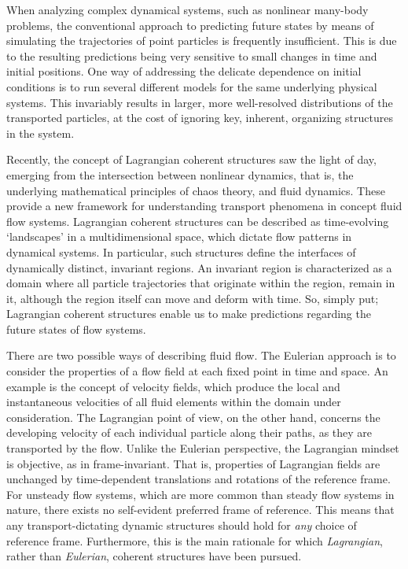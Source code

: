 When analyzing complex dynamical systems, such as nonlinear many-body problems,
the conventional approach to predicting future states by means of simulating
the trajectories of point particles is frequently insufficient. This is due
to the resulting predictions being very sensitive to small changes in time
and initial positions. One way of addressing the delicate dependence on initial
conditions is to run several different models for the same underlying physical
systems. This invariably results in larger, more well-resolved distributions
of the transported particles, at the cost of ignoring key, inherent, organizing
structures in the system.

Recently, the concept of Lagrangian coherent structures saw the light of day,
emerging from the intersection between nonlinear dynamics, that is, the
underlying mathematical principles of chaos theory, and fluid dynamics. These
provide a new framework for understanding transport phenomena in concept
fluid flow systems. Lagrangian coherent structures can be described as
time-evolving `landscapes' in a multidimensional space, which dictate flow
patterns in dynamical systems. In particular, such structures define the
interfaces of dynamically distinct, invariant regions. An invariant region is
characterized as a domain where all particle trajectories that originate within
the region, remain in it, although the region itself can move and deform with
time. So, simply put; Lagrangian coherent structures enable us to make
predictions regarding the future states of flow systems.

There are two possible ways of describing fluid flow. The Eulerian approach
is to consider the properties of a flow field at each fixed point in time and
space. An example is the concept of velocity fields, which produce the
local and instantaneous velocities of all fluid elements within the domain
under consideration. The Lagrangian point of view, on the other hand, concerns
the developing velocity of each individual particle along their paths, as they
are transported by the flow. Unlike the Eulerian perspective, the Lagrangian
mindset is objective, as in frame-invariant. That is, properties of Lagrangian
fields are unchanged by time-dependent translations and rotations of the
reference frame. For unsteady flow systems, which are more common than
steady flow systems in nature, there exists no self-evident preferred frame
of reference. This means that any transport-dictating dynamic structures
should hold for \emph{any} choice of reference frame. Furthermore, this is
the main rationale for which \emph{Lagrangian}, rather
than \emph{Eulerian}, coherent structures have been pursued.

